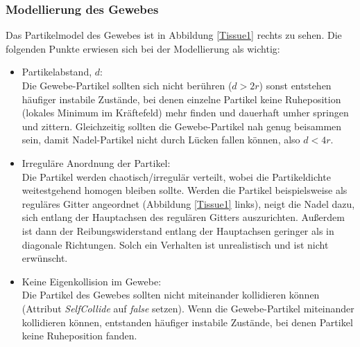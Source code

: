 


\subsubsection{Modellierung des Gewebes}
Das Partikelmodel des Gewebes ist in Abbildung \ref{Tissue1} rechts zu sehen. Die folgenden Punkte erwiesen sich bei der Modellierung als wichtig:

    \begin{itemize}
    
      \item Partikelabstand, $d$: \\ 
      Die Gewebe-Partikel sollten sich nicht berühren ($d>2r$) sonst entstehen häufiger instabile Zustände, bei denen einzelne Partikel keine Ruheposition (lokales Minimum im Kräftefeld) mehr finden und dauerhaft umher springen und zittern. Gleichzeitig sollten die Gewebe-Partikel nah genug beisammen sein, damit Nadel-Partikel nicht durch Lücken fallen können, also $d<4r$. 
      
      \item Irreguläre Anordnung der Partikel: \\ 
      Die Partikel werden chaotisch/irregulär verteilt, wobei die Partikeldichte weitestgehend homogen bleiben sollte. Werden die Partikel beispielsweise als reguläres Gitter angeordnet (Abbildung \ref{Tissue1} links), neigt die Nadel dazu, sich entlang der Hauptachsen des regulären Gitters auszurichten. Außerdem ist dann der Reibungswiderstand entlang der Hauptachsen geringer als in diagonale Richtungen. 
      Solch ein Verhalten ist unrealistisch und ist nicht erwünscht.
      
      
      \item Keine Eigenkollision im Gewebe: \\ 
      Die Partikel des Gewebes sollten nicht miteinander kollidieren können (Attribut \textit{SelfCollide} auf \textit{false} setzen). Wenn die Gewebe-Partikel miteinander kollidieren können, entstanden häufiger instabile Zustände, bei denen Partikel keine Ruheposition fanden.
      
    \end{itemize}
    
